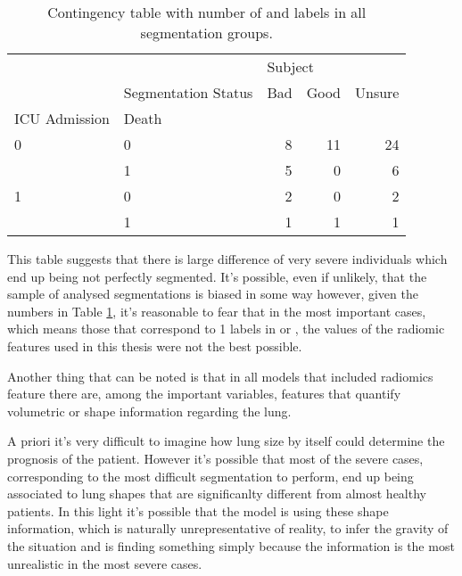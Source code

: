 \begin{table}
\centering
\caption{Contingency table with number of \death and \icu labels in all segmentation groups. \label{tab:ContingencyTableSegm}}
\begin{tabular}{llrrr}
\toprule
  & {} & \multicolumn{3}{l}{Subject} \\
  & Segmentation Status &     Bad & Good & Unsure \\
ICU Admission & Death &         &      &        \\
\midrule
0 & 0 &       8 &   11 &     24 \\
  & 1 &       5 &    0 &      6 \\
1 & 0 &       2 &    0 &      2 \\
  & 1 &       1 &    1 &      1 \\
\bottomrule
\end{tabular}
\end{table}

This table suggests that there is large difference of very severe individuals which end up being not perfectly segmented.
It's possible, even if unlikely, that the sample of analysed segmentations is biased in some way however, given the numbers in Table \ref{tab:ContingencyTableSegm}, it's reasonable to fear that in the most important cases, which means those that correspond to 1 labels in \death or \icu, the values of the radiomic features used in this thesis were not the best possible. 

Another thing that can be noted is that in all models that included radiomics feature there are, among the important variables, features that quantify volumetric or shape information regarding the lung.

A priori it's very difficult to imagine how lung size by itself could determine the prognosis of the patient.
However it's possible that most of the severe cases, corresponding to the most difficult segmentation to perform, end up being associated to lung shapes that are significanlty different from almost healthy patients.
In this light it's possible that the model is using these shape information, which is naturally unrepresentative of reality, to infer the gravity of the situation and is finding something simply because the information is the most unrealistic in the most severe cases.
